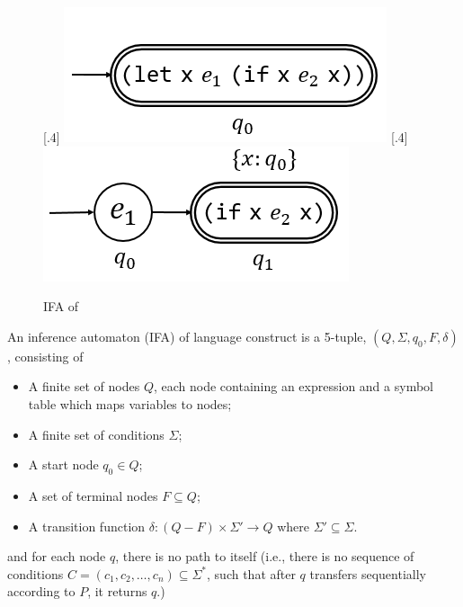 \begin{figure}[t]
    \centering
    [.4\linewidth]{
        \includegraphics[scale=0.25]{images/ifa/ifa-and-1.png}
    }
    [.4\linewidth]{
        \includegraphics[scale=0.25]{images/ifa/ifa-and-2.png}
    }
    \caption{IFA of }
    \label{fig:ifa-and}
\end{figure}


\begin{Def}

    An inference automaton (IFA) of language construct  is a 5-tuple, $(Q, \Sigma, q_0, F, \delta)$, consisting of

    \begin{itemize}
        \item A finite set of nodes $Q$, each node containing an expression and a symbol table which maps variables to nodes;
        \item A finite set of conditions $\Sigma$;
        \item A start node $q_0 \in Q$;
        \item A set of terminal nodes $F \subseteq Q$;
        \item A transition function $\delta: (Q-F) \times \Sigma' \to Q$ where $\Sigma' \subseteq \Sigma$.
    \end{itemize}
    and for each node $q$, there is no path to itself (i.e., there is no sequence of conditions $C = (c_1,c_2,\ldots,c_n)\subseteq \Sigma^*$, such that after $q$ transfers sequentially according to $P$, it returns $q$.)

\end{Def}

